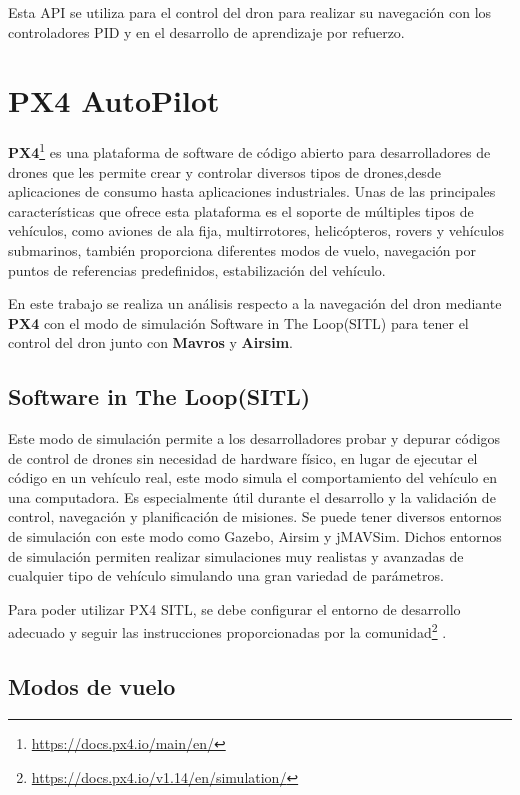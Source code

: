 Esta API se utiliza para el control del dron para realizar su navegación con los controladores PID y en 
el desarrollo de aprendizaje por refuerzo. 

\section{PX4 AutoPilot}
\label{sec:px4}

\textbf{PX4}\footnote{\url{https://docs.px4.io/main/en/}} es una plataforma de software de código abierto para desarrolladores de drones que les permite crear 
y controlar diversos tipos de drones,desde aplicaciones de consumo hasta aplicaciones industriales.
Unas de las principales características que ofrece esta plataforma es el soporte de múltiples tipos de vehículos, como aviones de 
ala fija, multirrotores, helicópteros, rovers y vehículos submarinos, también proporciona diferentes modos de vuelo, 
navegación por puntos de referencias predefinidos, estabilización del vehículo. 

En este trabajo se realiza un análisis respecto a la navegación del dron mediante \textbf{PX4} con el modo de simulación Software in The Loop(SITL) para tener el control del dron junto con 
\textbf{Mavros} y \textbf{Airsim}.
\subsection{Software in The Loop(SITL)}
\label{sec:px4 sitl} 
Este modo de simulación permite a los desarrolladores probar y depurar códigos de control de drones sin necesidad de hardware físico, en lugar de ejecutar el código en un 
vehículo real, este modo simula el comportamiento del vehículo en una computadora. Es especialmente útil durante el desarrollo y la validación de control, navegación y 
planificación de misiones.
Se puede tener diversos entornos de simulación con este modo como Gazebo, Airsim y jMAVSim. Dichos entornos de simulación permiten realizar simulaciones muy realistas y avanzadas 
de cualquier tipo de vehículo simulando una gran variedad de parámetros.

Para poder utilizar PX4 SITL, se debe configurar el entorno de desarrollo adecuado y seguir las instrucciones proporcionadas por la comunidad\footnote{\url{https://docs.px4.io/v1.14/en/simulation/}} .

\subsection{Modos de vuelo}
\label{sec:flight modes} 

